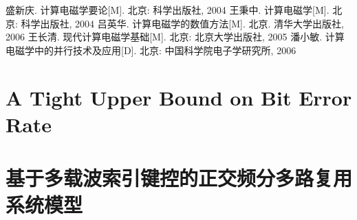 \documentclass[doctor]{thesisUESTC}
\begin{document}
\thesisappendix

\begin{thesisachievement}
 盛新庆. 计算电磁学要论[M]. 北京: 科学出版社, 2004
 王秉中. 计算电磁学[M]. 北京: 科学出版社, 2004
 吕英华. 计算电磁学的数值方法[M]. 北京. 清华大学出版社, 2006
 王长清. 现代计算电磁学基础[M]. 北京: 北京大学出版社, 2005
 潘小敏. 计算电磁学中的并行技术及应用[D]. 北京: 中国科学院电子学研究所, 2006
\end{thesisachievement}

\thesistranslationoriginal
\section{A Tight Upper Bound on Bit Error Rate}


\thesistranslationchinese

\section{基于多载波索引键控的正交频分多路复用系统模型}
\end{document}
